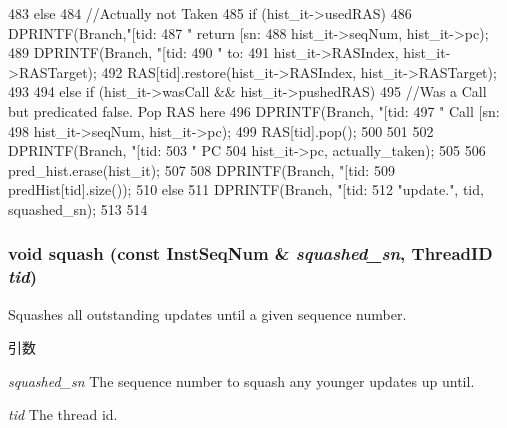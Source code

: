 \begin{DoxyCode}
{{{483         } else {
484            //Actually not Taken
485            if (hist_it->usedRAS) {
486                 DPRINTF(Branch,"[tid: %
487                         "  return [sn:%
488                         hist_it->seqNum, hist_it->pc);
489                 DPRINTF(Branch, "[tid:%
490                         " to: %
491                         hist_it->RASIndex, hist_it->RASTarget);
492                 RAS[tid].restore(hist_it->RASIndex, hist_it->RASTarget);
493 
494            } else if (hist_it->wasCall && hist_it->pushedRAS) {
495                  //Was a Call but predicated false. Pop RAS here
496                  DPRINTF(Branch, "[tid: %
497                          "  Call [sn:%
498                          hist_it->seqNum, hist_it->pc);
499                  RAS[tid].pop();
500            }
501         }
502         DPRINTF(Branch, "[tid:%
503                 " PC %
504                 hist_it->pc, actually_taken);
505 
506         pred_hist.erase(hist_it);
507 
508         DPRINTF(Branch, "[tid:%
509                                          predHist[tid].size());
510     } else {
511         DPRINTF(Branch, "[tid:%
512                 "update.\n", tid, squashed_sn);
513     }
514 }
\end{DoxyCode}
\hypertarget{classBPredUnit_af62f441ad740da2cd987637cfa87dfe5}{
\subsubsection[{squash}]{\setlength{\rightskip}{0pt plus 5cm}void squash (const {\bf InstSeqNum} \& {\em squashed\_\-sn}, \/  {\bf ThreadID} {\em tid})}}
\label{classBPredUnit_af62f441ad740da2cd987637cfa87dfe5}
Squashes all outstanding updates until a given sequence number. 
\begin{DoxyParams}{引数}
\item[{\em squashed\_\-sn}]The sequence number to squash any younger updates up until. \item[{\em tid}]The thread id. \end{DoxyParams}



